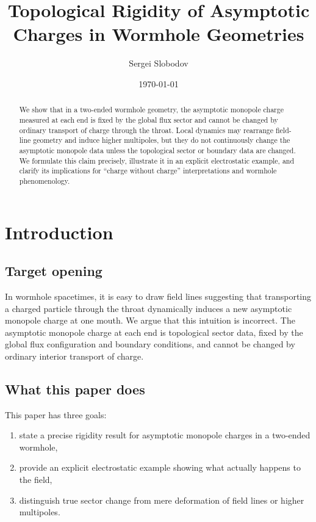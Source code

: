 \documentclass[11pt]{article}
\title{Topological Rigidity of Asymptotic Charges in Wormhole Geometries}
\author{Sergei Slobodov}
\date{\today}
\begin{document}
\maketitle

\begin{abstract}
We show that in a two-ended wormhole geometry, the asymptotic monopole charge measured at each end is fixed by the global flux sector and cannot be changed by ordinary transport of charge through the throat. Local dynamics may rearrange field-line geometry and induce higher multipoles, but they do not continuously change the asymptotic monopole data unless the topological sector or boundary data are changed. We formulate this claim precisely, illustrate it in an explicit electrostatic example, and clarify its implications for ``charge without charge'' interpretations and wormhole phenomenology.
\end{abstract}

\section{Introduction}

\subsection*{Target opening}
In wormhole spacetimes, it is easy to draw field lines suggesting that transporting a charged particle through the throat dynamically induces a new asymptotic monopole charge at one mouth. We argue that this intuition is incorrect. The asymptotic monopole charge at each end is topological sector data, fixed by the global flux configuration and boundary conditions, and cannot be changed by ordinary interior transport of charge.

\subsection*{What this paper does}
This paper has three goals:
\begin{enumerate}[label=\arabic*.]
    \item state a precise rigidity result for asymptotic monopole charges in a two-ended wormhole,
    \item provide an explicit electrostatic example showing what actually happens to the field,
    \item distinguish true sector change from mere deformation of field lines or higher multipoles.
\end{enumerate}
\end{document}
